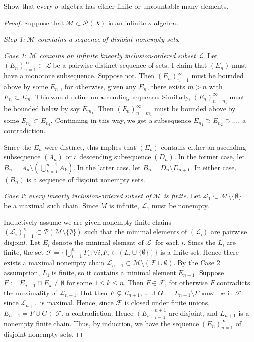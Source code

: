 \documentclass{article}
\begin{document}
 Show that every $\sigma$-algebra has either finite or uncountable many elements.
\begin{proof}
Suppose that $\mathcal M \subset \mathcal P (X)$ is an infinite $\sigma$-algebra. 

\emph{Step 1: $\mathcal M$ countains a sequence of disjoint nonempty sets.}

\emph{Case 1: $\mathcal M$ contains an infinite linearly inclusion-ordered subset $\mathcal L$}.  Let $(E_n)_{n=1}^\infty \subset \mathcal L$ be a pairwise distinct sequence of sets. I claim that $(E_n)$ must have a monotone subsequence. Suppose not. Then $(E_n)_{n=1}^\infty$ must be bounded above by some $E_{n_1}$, for otherwise, given any $E_n$, there exists $m > n$ with $E_n \subset E_m$. This would define an ascending sequence.  Similarly, $(E_n)_{n=n_1}^\infty$ must be bounded below by say $E_{m_1}$.  Then $(E_n)_{n=m_1}^\infty$ must be bounded above by some $E_{n_2} \subset E_{n_1}$. Continuing in this way, we get a subsequence $E_{n_1} \supset E_{n_2} \supset \ldots$, a contradiction.


Since the $E_n$ were distinct, this implies that $(E_n)$ contains either an ascending subsequence $(A_n)$ or a descending subsequence $(D_n)$.  In the former case, let $B_n = A_n \setminus ( \bigcup_{k=1}^{n-1} A_k)$. In the latter case, let $B_n = D_n \setminus D_{n+1}$.  In either case, $(B_n)$ is a sequence of disjoint nonempty sets.

\emph{Case 2: every linearly inclusion-ordered subset of $\mathcal M$ is finite.}  Let $\mathcal L_1 \subset \mathcal M \setminus \{\emptyset\}$ be a maximal such chain.  Since $M$ is infinite, $\mathcal L_1$ must be nonempty.

Inductively assume we are given nonempty finite chains $(\mathcal L_i)_{i=1}^n \subset \mathcal P ( \mathcal M \setminus \{\emptyset\} )$ such that the minimal elements of $(\mathcal L_i)$ are pairwise disjoint. Let $E_i$ denote the minimal element of $\mathcal L_i$ for each $i$.  Since the $L_i$ are finite, the set $\mathcal F = \{ \bigcup_{i=1}^n F_i : \forall i,  F_i \in (L_i \cup \{\emptyset\}) \}$ is a finite set. Hence there exists a maximal nonempty chain $\mathcal L_{n+1} \subset \mathcal M \setminus (\mathcal F \cup {\emptyset})$. By the Case 2 assumption, $L_1$ is finite, so it contains a minimal element $E_{n+1}$.  Suppose $F := E_{n+1} \cap E_k \neq \emptyset$ for some $1\le k \le n$.  Then $F \in \mathcal F$, for otherwise $F$ contradicts the maximality of $\mathcal L_{n+1}$.  But then $F \subsetneq E_{n+1}$, and $G := E_{n+1} \setminus F$ must be in $\mathcal F$ since $\mathcal L_{n+1}$ is maximal.  Hence, since $\mathcal F$ is closed under finite unions, $E_{n+1} = F \cup G \in \mathcal F$, a contradiction. Hence $(E_i)_{i=1}^{n+1}$ are disjoint, and $L_{n+1}$ is a nonempty finite chain. Thus, by induction, we have the sequence $(E_n)_{n=1}^\infty$ of disjoint nonempty sets.


\end{proof}
\end{document}
